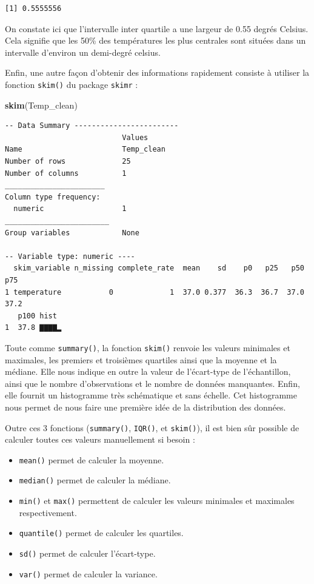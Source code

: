 \documentclass[a4paperpaper,]{article}
\newenvironment{Shaded}{\begin{snugshade}}{\end{snugshade}}
\newcommand{\KeywordTok}[1]{\textcolor[rgb]{0.12,0.11,0.11}{\textbf{#1}}}
\newcommand{\NormalTok}[1]{\textcolor[rgb]{0.12,0.11,0.11}{#1}}
\providecommand{\tightlist}{%
  \setlength{\itemsep}{0pt}\setlength{\parskip}{0pt}}
\begin{document}
\begin{verbatim}
[1] 0.5555556
\end{verbatim}

On constate ici que l'intervalle inter quartile a une largeur de 0.55 degrés Celsius. Cela signifie que les 50\% des températures les plus centrales sont situées dans un intervalle d'environ un demi-degré celsius.

Enfin, une autre façon d'obtenir des informations rapidement consiste à utiliser la fonction \texttt{skim()} du package \texttt{skimr} :

\begin{Shaded}
\begin{Highlighting}[]
\KeywordTok{skim}\NormalTok{(Temp_clean)}
\end{Highlighting}
\end{Shaded}

\begin{verbatim}
-- Data Summary ------------------------
                           Values    
Name                       Temp_clean
Number of rows             25        
Number of columns          1         
_______________________              
Column type frequency:               
  numeric                  1         
________________________             
Group variables            None      

-- Variable type: numeric ----
  skim_variable n_missing complete_rate  mean    sd    p0   p25   p50   p75
1 temperature           0             1  37.0 0.377  36.3  36.7  37.0  37.2
   p100 hist 
1  37.8 ▇▇▇▇▂
\end{verbatim}

Toute comme \texttt{summary()}, la fonction \texttt{skim()} renvoie les valeurs minimales et maximales, les premiers et troisièmes quartiles ainsi que la moyenne et la médiane. Elle nous indique en outre la valeur de l'écart-type de l'échantillon, ainsi que le nombre d'observations et le nombre de données manquantes. Enfin, elle fournit un histogramme très schématique et sans échelle. Cet histogramme nous permet de nous faire une première idée de la distribution des données.

Outre ces 3 fonctions (\texttt{summary()}, \texttt{IQR()}, et \texttt{skim()}), il est bien sûr possible de calculer toutes ces valeurs manuellement si besoin :

\begin{itemize}
\tightlist
\item
  \texttt{mean()} permet de calculer la moyenne.
\item
  \texttt{median()} permet de calculer la médiane.
\item
  \texttt{min()} et \texttt{max()} permettent de calculer les valeurs minimales et maximales respectivement.
\item
  \texttt{quantile()} permet de calculer les quartiles.
\item
  \texttt{sd()} permet de calculer l'écart-type.
\item
  \texttt{var()} permet de calculer la variance.
\end{itemize}
\end{document}
